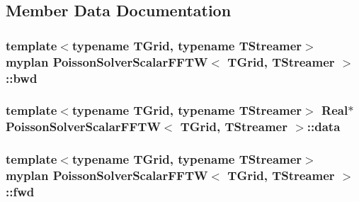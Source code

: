 \subsection{Member Data Documentation}
\hypertarget{class_poisson_solver_scalar_f_f_t_w_a01d910395049c4252d4924baa032b13d}{}
\subsubsection[{bwd}]{\setlength{\rightskip}{0pt plus 5cm}template$<$typename T\+Grid, typename T\+Streamer$>$ {\bf myplan} {\bf Poisson\+Solver\+Scalar\+F\+F\+T\+W}$<$ T\+Grid, T\+Streamer $>$\+::bwd\hspace{0.3cm}{\ttfamily [protected]}}\label{class_poisson_solver_scalar_f_f_t_w_a01d910395049c4252d4924baa032b13d}
\hypertarget{class_poisson_solver_scalar_f_f_t_w_ae4f5219ed358cd8d227084a7fa92e686}{}
\subsubsection[{data}]{\setlength{\rightskip}{0pt plus 5cm}template$<$typename T\+Grid, typename T\+Streamer$>$ {\bf Real}$\ast$ {\bf Poisson\+Solver\+Scalar\+F\+F\+T\+W}$<$ T\+Grid, T\+Streamer $>$\+::data\hspace{0.3cm}{\ttfamily [protected]}}\label{class_poisson_solver_scalar_f_f_t_w_ae4f5219ed358cd8d227084a7fa92e686}
\hypertarget{class_poisson_solver_scalar_f_f_t_w_a7773ce95a3312d7a5213c060586aed4b}{}
\subsubsection[{fwd}]{\setlength{\rightskip}{0pt plus 5cm}template$<$typename T\+Grid, typename T\+Streamer$>$ {\bf myplan} {\bf Poisson\+Solver\+Scalar\+F\+F\+T\+W}$<$ T\+Grid, T\+Streamer $>$\+::fwd\hspace{0.3cm}{\ttfamily [protected]}}\label{class_poisson_solver_scalar_f_f_t_w_a7773ce95a3312d7a5213c060586aed4b}
\hypertarget{class_poisson_solver_scalar_f_f_t_w_a14ffa693193fcc1d5391c452dcf11d34}{}
